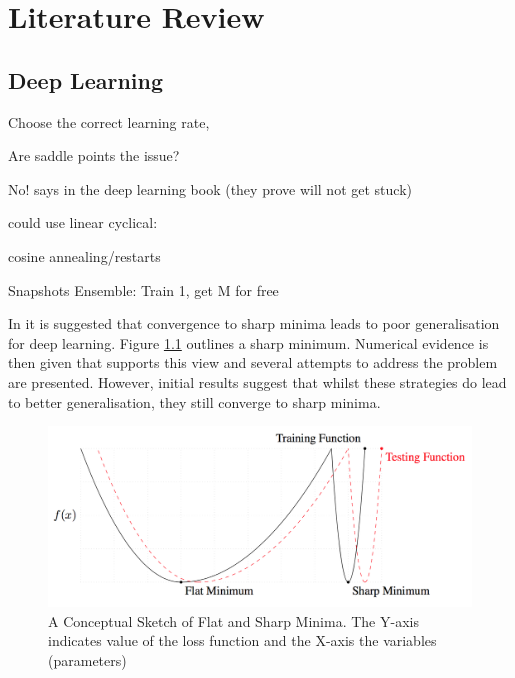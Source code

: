 
\chapter{Literature Review}\label{cha:literature}

\section{Deep Learning}\label{sec:deep_learning_lit}

Choose the correct learning rate, 

Are saddle points the issue? \cite{Dauphin_de_Vries_Bengio_2015}

No! says \cite{Goodfellow-et-al-2016} in the deep learning book (they prove will not get stuck)

could use linear cyclical: \cite{Smith_2015}

cosine annealing/restarts \cite{Loshchilov_Hutter_2016}

Snapshots Ensemble: Train 1, get M for free \cite{Huang_Li_Pleiss_Liu_Hopcroft_Weinberger_2017}

In \cite{Keskar_Mudigere_Nocedal_Smelyanskiy_Tang_2016} it is suggested that convergence to sharp minima leads to poor generalisation for deep learning.
Figure \ref{fig:wide_optima} outlines a sharp minimum.
Numerical evidence is then given that supports this view and several attempts to address the problem are presented.
However, initial results suggest that whilst these strategies do lead to better generalisation, they still converge to sharp minima.

\begin{figure}
    \centering
    \includegraphics[width=\textwidth]{./img/Wide_optima.png}
    \caption{A Conceptual Sketch of Flat and Sharp Minima. The Y-axis indicates value of the loss function and the X-axis the variables (parameters) \cite{Keskar_Mudigere_Nocedal_Smelyanskiy_Tang_2016}}
    \label{fig:wide_optima}
\end{figure}


